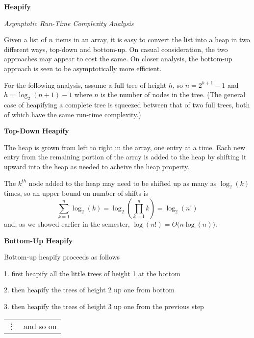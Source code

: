 \documentclass{article}
\begin{document}
{\Large\bf Heapify}

{\large\it Asymptotic Run-Time Complexity Analysis}

\vspace{1pc}
Given a list of $n$ items in an array, it is easy to convert the list into a
heap in two different ways, top-down and bottom-up. On casual consideration,
the two approaches may appear to cost the same. On closer analysis, the
bottom-up approach is seen to be asymptotically more efficient.

\vspace{1pc}
For the following analysis,
assume a full tree of height $h$,
so $n=2^{h+1}-1$ and $h=\log_2(n+1) - 1$
where $n$ is the number of nodes in the tree.
(The general case of heapifying a complete tree is squeezed between that of two
full trees, both of which have the same run-time complexity.)

\vspace{1pc}
{\large\bf Top-Down Heapify}

\vspace{1pc}
The heap is grown from left to right in the array, one entry at a time.
Each new entry from the remaining portion of the array is added to the heap
by shifting it upward into the heap as needed to acheive the heap property.

\vspace{1pc}
The $k^{th}$ node added to the heap may need to be shifted up as many as
$\log_2(k)$ times, so an upper bound on number of shifts is
\[
  \sum_{k=1}^{n} \log_2(k)
=
  \log_2\!\!\left(\prod_{k=1}^{n} k\right)
=
  \log_2(n!)
\]
and, as we showed earlier in the semester, $\log(n!)=\Theta\big(n\log(n)\big)$.

\vspace{1pc}
{\large\bf Bottom-Up Heapify}

\vspace{1pc}
Bottom-up heapify proceeds as follows

\vspace{1pc}
1. first heapify all the little trees of height 1 at the bottom

2. then heapify the trees of height 2 up one from bottom

3. then heapify the trees of height 3 up one from the previous step

\begin{tabular}{ll}
\vdots & and so on \\
\end{tabular}
\end{document}
